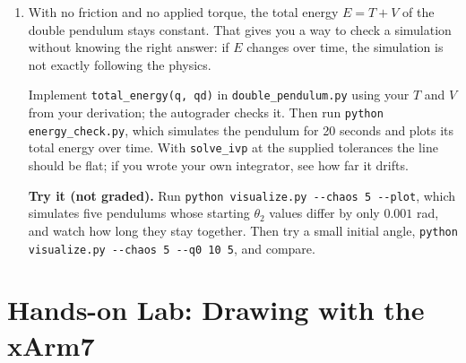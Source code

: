 \documentclass{16384_doc}
\begin{document}
\begin{questions}
\begin{enumerate}[label=\alph*.]
        The output format should be a tuple \verb!(t, q, qd)! of numpy arrays, sampled every \verb!dt! seconds from $0$ to $T$ inclusive (use \verb!np.arange(0, T + dt / 2, dt)!, so there are $N = T/\Delta t + 1$ samples):
        \begin{itemize}
            \item \verb!t!: the sample times $0, \Delta t, 2\Delta t, \dots, T$, shape $(N,)$.
            \item \verb!q!: the joint angles $[\theta_1, \theta_2]$ at each sample time, shape $(N, 2)$.
            \item \verb!qd!: the joint velocities $[\dot\theta_1, \dot\theta_2]$ at each sample time, shape $(N, 2)$.
        \end{itemize}
        The first row of \verb!q! and \verb!qd! is the initial state \verb!q0!, \verb!qd0!.

        Run \verb!python local_autograder.py! to check parts (a) and (b), then watch your pendulum with \verb!python visualize.py!.

        \item \text{[5 points]} With no friction and no applied torque, the total energy $E = T + V$ of the double pendulum stays constant. That gives you a way to check a simulation without knowing the right answer: if $E$ changes over time, the simulation is not exactly following the physics.

        Implement \verb!total_energy(q, qd)! in \verb!double_pendulum.py! using your $T$ and $V$ from your derivation; the autograder checks it.  Then run \verb!python energy_check.py!, which simulates the pendulum for 20 seconds and plots its total energy over time.  With \verb!solve_ivp! at the supplied tolerances the line should be flat; if you wrote your own integrator, see how far it drifts.

        \textbf{Try it (not graded).}  Run \verb!python visualize.py --chaos 5 --plot!, which simulates five pendulums whose starting $\theta_2$ values differ by only $0.001$ rad, and watch how long they stay together.  Then try a small initial angle, \verb!python visualize.py --chaos 5 --q0 10 5!, and compare.
    \end{enumerate}
\end{questions}

\section{Hands-on Lab: Drawing with the xArm7}
\end{document}
